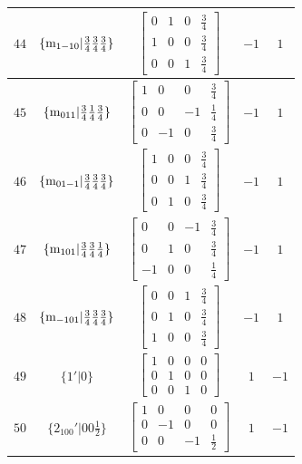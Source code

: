 \documentclass[fleqn,8pt]{jsarticle}
\begin{document}
\begin{longtable}{ccccc}
$ 44 $ & $ \{{\rm m}_{1-10}|\frac{3}{4} \frac{3}{4} \frac{3}{4}\} $ & $ \begin{bmatrix} 0 & 1 & 0 & \frac{3}{4} \\ 1 & 0 & 0 & \frac{3}{4} \\ 0 & 0 & 1 & \frac{3}{4} \end{bmatrix} $ & $ -1 $ & $ 1 $ \\ \hline
$ 45 $ & $ \{{\rm m}_{011}|\frac{3}{4} \frac{1}{4} \frac{3}{4}\} $ & $ \begin{bmatrix} 1 & 0 & 0 & \frac{3}{4} \\ 0 & 0 & -1 & \frac{1}{4} \\ 0 & -1 & 0 & \frac{3}{4} \end{bmatrix} $ & $ -1 $ & $ 1 $ \\ \hline
$ 46 $ & $ \{{\rm m}_{01-1}|\frac{3}{4} \frac{3}{4} \frac{3}{4}\} $ & $ \begin{bmatrix} 1 & 0 & 0 & \frac{3}{4} \\ 0 & 0 & 1 & \frac{3}{4} \\ 0 & 1 & 0 & \frac{3}{4} \end{bmatrix} $ & $ -1 $ & $ 1 $ \\ \hline
$ 47 $ & $ \{{\rm m}_{101}|\frac{3}{4} \frac{3}{4} \frac{1}{4}\} $ & $ \begin{bmatrix} 0 & 0 & -1 & \frac{3}{4} \\ 0 & 1 & 0 & \frac{3}{4} \\ -1 & 0 & 0 & \frac{1}{4} \end{bmatrix} $ & $ -1 $ & $ 1 $ \\ \hline
$ 48 $ & $ \{{\rm m}_{-101}|\frac{3}{4} \frac{3}{4} \frac{3}{4}\} $ & $ \begin{bmatrix} 0 & 0 & 1 & \frac{3}{4} \\ 0 & 1 & 0 & \frac{3}{4} \\ 1 & 0 & 0 & \frac{3}{4} \end{bmatrix} $ & $ -1 $ & $ 1 $ \\ \hline
$ 49 $ & $ \{1{}'|0\} $ & $ \begin{bmatrix} 1 & 0 & 0 & 0 \\ 0 & 1 & 0 & 0 \\ 0 & 0 & 1 & 0 \end{bmatrix} $ & $ 1 $ & $ -1 $ \\ \hline
$ 50 $ & $ \{2{}_{100}{}'|0 0 \frac{1}{2}\} $ & $ \begin{bmatrix} 1 & 0 & 0 & 0 \\ 0 & -1 & 0 & 0 \\ 0 & 0 & -1 & \frac{1}{2} \end{bmatrix} $ & $ 1 $ & $ -1 $ \\ \hline

\end{longtable}
\end{document}

